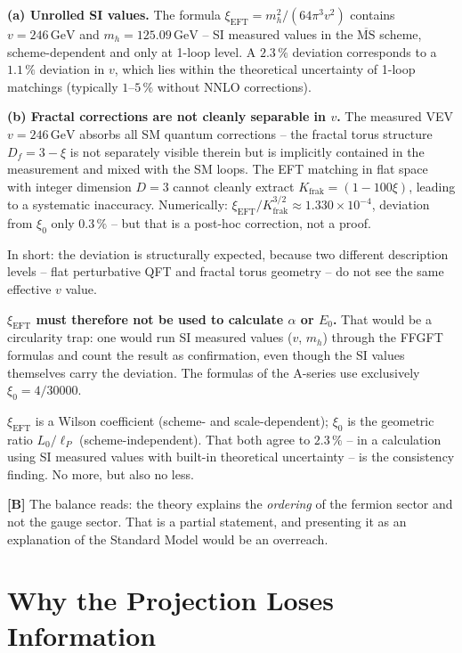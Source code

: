 \textbf{(a) Unrolled SI values.} The formula
$\xi_\text{EFT}=m_h^2/(64\pi^3 v^2)$ contains $v=246\,\text{GeV}$ and
$m_h=125{.}09\,\text{GeV}$ -- SI measured values in the $\overline{\text{MS}}$
scheme, scheme-dependent and only at 1-loop level. A $2{.}3\,\%$ deviation
corresponds to a $1{.}1\,\%$ deviation in $v$, which lies within the theoretical
uncertainty of 1-loop matchings (typically $1$--$5\,\%$ without NNLO corrections).

\textbf{(b) Fractal corrections are not cleanly separable in $v$.} The measured
VEV $v=246\,\text{GeV}$ absorbs all SM quantum corrections -- the fractal torus
structure $D_f=3-\xi$ is not separately visible therein but is implicitly
contained in the measurement and mixed with the SM loops. The EFT matching in
flat space with integer dimension $D=3$ cannot cleanly extract $K_\text{frak}=(1-100\xi)$,
leading to a systematic inaccuracy. Numerically:
$\xi_\text{EFT}/K_\text{frak}^{3/2}\approx1{.}330\times10^{-4}$, deviation from
$\xi_0$ only $0{.}3\,\%$ -- but that is a post-hoc correction, not a proof.

In short: the deviation is structurally expected, because two different description
levels -- flat perturbative QFT and fractal torus geometry -- do not see the same
effective $v$ value.

\textbf{$\xi_\text{EFT}$ must therefore not be used to calculate $\alpha$ or
$E_0$.} That would be a circularity trap: one would run SI measured values ($v$,
$m_h$) through the FFGFT formulas and count the result as confirmation, even
though the SI values themselves carry the deviation. The formulas of the A-series
use exclusively $\xi_0=4/30000$.

$\xi_\text{EFT}$ is a Wilson coefficient (scheme- and scale-dependent);
$\xi_0$ is the geometric ratio $L_0/\ell_P$ (scheme-independent). That both agree
to $2{.}3\,\%$ -- in a calculation using SI measured values with built-in
theoretical uncertainty -- is the consistency finding. No more, but also no less.

\textbf{[B]} The balance reads: the theory explains the \emph{ordering} of the
fermion sector and not the gauge sector. That is a partial statement, and
presenting it as an explanation of the Standard Model would be an overreach.

\section{Why the Projection Loses Information}

